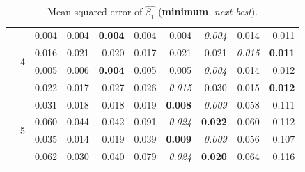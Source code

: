 \documentclass[authoryear, review, 11pt]{elsarticle}
\begin{document}
\begin{table}
\begin{center}
{\begin{tabular}{ccrrrrrrrr}
  \cline{3-10}
   & \multirow{4}{*}{4} & 0.004 & 0.004 & \textbf{0.004} & 0.004 & 0.004 & \emph{0.004} & 0.014 & 0.011 \\ 
   &  & 0.016 & 0.021 & 0.020 & 0.017 & 0.021 & 0.021 & \emph{0.015} & \textbf{0.011} \\ 
   &  & 0.005 & 0.006 & \textbf{0.004} & 0.005 & 0.005 & \emph{0.004} & 0.014 & 0.012 \\ 
   &  & 0.022 & 0.017 & 0.027 & 0.026 & \emph{0.015} & 0.030 & 0.015 & \textbf{0.012} \\ 
  \cline{3-10}
   & \multirow{4}{*}{5} & 0.031 & 0.018 & 0.018 & 0.019 & \textbf{0.008} & \emph{0.009} & 0.058 & 0.111 \\ 
   &  & 0.060 & 0.044 & 0.042 & 0.091 & \emph{0.024} & \textbf{0.022} & 0.060 & 0.112 \\ 
   &  & 0.035 & 0.014 & 0.019 & 0.039 & \textbf{0.009} & \emph{0.009} & 0.056 & 0.107 \\ 
   &  & 0.062 & 0.030 & 0.040 & 0.079 & \emph{0.024} & \textbf{0.020} & 0.064 & 0.116 \\ 
  \end{tabular}}
\caption{Mean squared error of $\hat{\beta_1}$ (\textbf{minimum}, \emph{next best}).\label{table:X1-mse}}
		\end{center}
		\end{table}	
 
\end{document}

